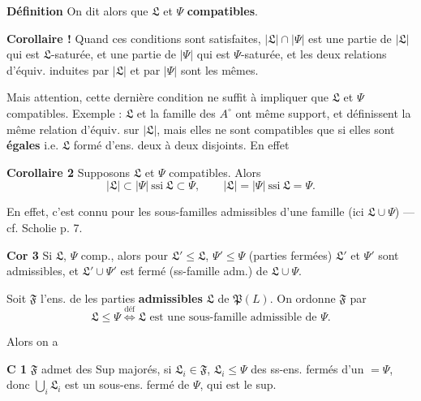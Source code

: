 \documentclass[11pt,a4paper]{article}
\begin{document}
\textbf{Définition} On dit alors que $\mathfrak{L}$ et $\Psi$ \textbf{compatibles}.

\textbf{Corollaire !} Quand ces conditions sont satisfaites, $|\mathfrak{L}| \cap |\Psi|$ est une partie de $|\mathfrak{L}|$ qui est $\mathfrak{L}$-saturée, et une partie de $|\Psi|$ qui est $\Psi$-saturée, et les deux relations d'équiv. induites par $|\mathfrak{L}|$ et par $|\Psi|$ sont les mêmes.

Mais attention, cette dernière condition ne suffit  à impliquer que $\mathfrak{L}$ et $\Psi$ compatibles. Exemple : $\mathfrak{L}$ et la famille  des $A^{\circ}$ ont même support, et définissent la même relation d'équiv. sur $|\mathfrak{L}|$, mais elles ne sont compatibles que si elles sont \textbf{égales}  i.e. $\mathfrak{L}$ formé d'ens. deux à deux disjoints. En effet 

\textbf{Corollaire 2} Supposons $\mathfrak{L}$ et $\Psi$ compatibles. Alors
\[
  |\mathfrak{L}| \subset |\Psi| \ \text{ssi}\ \mathfrak{L} \subset \Psi , \qquad |\mathfrak{L}| = |\Psi| \ \text{ssi}\ \mathfrak{L} = \Psi .
\]

En effet, c'est connu pour les sous-familles admissibles d'une famille (ici $\mathfrak{L} \cup \Psi$) — cf. Scholie p. 7.

\textbf{Cor 3} Si $\mathfrak{L}$, $\Psi$ comp., alors pour $\mathfrak{L}' \leq \mathfrak{L}$, $\Psi' \leq \Psi$ (parties fermées) $\mathfrak{L}'$ et $\Psi'$ sont admissibles, et $\mathfrak{L}' \cup \Psi'$ est fermé (ss-famille adm.) de $\mathfrak{L} \cup \Psi$.

Soit $\mathfrak{F}$ l'ens. de  les parties \textbf{admissibles} $\mathfrak{L}$ de $\mathfrak{P}(L)$. On ordonne $\mathfrak{F}$ par
\[
  \mathfrak{L} \leq \Psi \overset{\text{déf}}{\Longleftrightarrow} \mathfrak{L} \text{ est une sous-famille admissible de } \Psi .
\]


Alors on a

\textbf{C 1} $\mathfrak{F}$ admet des Sup majorés,  si $\mathfrak{L}_i \in \mathfrak{F}$, $\mathfrak{L}_i \leq \Psi$ des ss-ens. fermés d'un $= \Psi$, donc $\bigcup_i \mathfrak{L}_i$ est un sous-ens. fermé de $\Psi$, qui est le sup.
\end{document}
